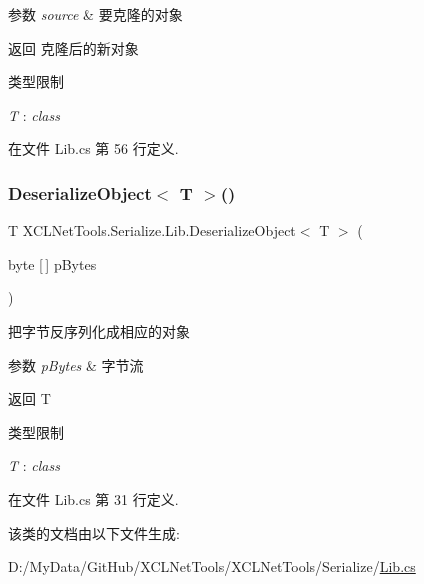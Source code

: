 \begin{DoxyParams}{参数}
{\em source} & 要克隆的对象\\
\hline
\end{DoxyParams}
\begin{DoxyReturn}{返回}
克隆后的新对象
\end{DoxyReturn}
\begin{Desc}
\item[类型限制]\begin{description}
\item[{\em T} : {\em class}]\end{description}
\end{Desc}


在文件 Lib.\+cs 第 56 行定义.

\mbox{\label{class_x_c_l_net_tools_1_1_serialize_1_1_lib_ae2d400cea76a1f11f5141deab7c6d2b1}} 
\subsubsection{\texorpdfstring{Deserialize\+Object$<$ T $>$()}{DeserializeObject< T >()}}
{\footnotesize\ttfamily T X\+C\+L\+Net\+Tools.\+Serialize.\+Lib.\+Deserialize\+Object$<$ T $>$ (\begin{DoxyParamCaption}\item[{byte \mbox{[}$\,$\mbox{]}}]{p\+Bytes }\end{DoxyParamCaption})}



把字节反序列化成相应的对象 


\begin{DoxyParams}{参数}
{\em p\+Bytes} & 字节流\\
\hline
\end{DoxyParams}
\begin{DoxyReturn}{返回}
T
\end{DoxyReturn}
\begin{Desc}
\item[类型限制]\begin{description}
\item[{\em T} : {\em class}]\end{description}
\end{Desc}


在文件 Lib.\+cs 第 31 行定义.



该类的文档由以下文件生成\+:\begin{DoxyCompactItemize}
\item 
D\+:/\+My\+Data/\+Git\+Hub/\+X\+C\+L\+Net\+Tools/\+X\+C\+L\+Net\+Tools/\+Serialize/\hyperlink{_serialize_2_lib_8cs}{Lib.\+cs}\end{DoxyCompactItemize}
